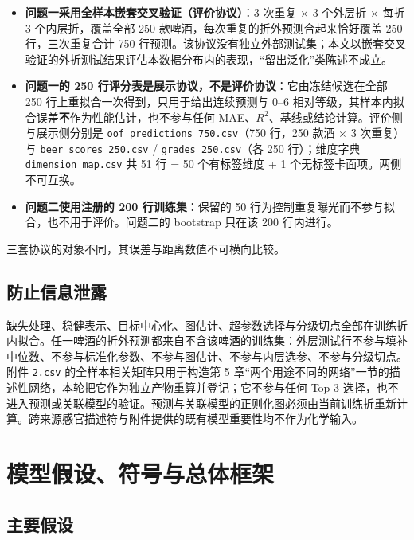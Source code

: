 \documentclass[11pt,a4paper]{article}
\providecommand{\tightlist}{%
  \setlength{\itemsep}{0pt}\setlength{\parskip}{0pt}}
\begin{document}
\begin{itemize}
\tightlist
\item
  \textbf{问题一采用全样本嵌套交叉验证（评价协议）}：3 次重复 × 3
  个外层折 × 每折 3 个内层折，覆盖全部 250
  款啤酒，每次重复的折外预测合起来恰好覆盖 250 行，三次重复合计 750
  行预测。该协议没有独立外部测试集；本文以嵌套交叉验证的外折测试结果评估本数据分布内的表现，``留出泛化''类陈述不成立。
\item
  \textbf{问题一的 250
  行评分表是展示协议，不是评价协议}：它由冻结候选在全部 250
  行上重拟合一次得到，只用于给出连续预测与 0--6
  相对等级，其样本内拟合误差\textbf{不}作为性能估计，也不参与任何
  MAE、\(R^2\)、基线或结论计算。评价侧与展示侧分别是
  \texttt{oof\_predictions\_750.csv}（750 行，250 款酒 × 3 次重复）与
  \texttt{beer\_scores\_250.csv} / \texttt{grades\_250.csv}（各 250
  行）；维度字典 \texttt{dimension\_map.csv} 共 51 行 = 50 个有标签维度
  + 1 个无标签卡面项。两侧不可互换。
\item
  \textbf{问题二使用注册的 200 行训练集}：保留的 50
  行为控制重复曝光而不参与拟合，也不用于评价。问题二的 bootstrap 只在该
  200 行内进行。
\end{itemize}

三套协议的对象不同，其误差与距离数值不可横向比较。

\subsection{防止信息泄露}\label{ux9632ux6b62ux4fe1ux606fux6cc4ux9732}

缺失处理、稳健表示、目标中心化、图估计、超参数选择与分级切点全部在训练折内拟合。任一啤酒的折外预测都来自不含该啤酒的训练集：外层测试行不参与填补中位数、不参与标准化参数、不参与图估计、不参与内层选参、不参与分级切点。附件
\texttt{2.csv} 的全样本相关矩阵只用于构造第 5
章``两个用途不同的网络''一节的描述性网络，本轮把它作为独立产物重算并登记；它不参与任何
Top-3
选择，也不进入预测或关联模型的验证。预测与关联模型的正则化图必须由当前训练折重新计算。跨来源感官描述符与附件提供的既有模型重要性均不作为化学输入。

\section{模型假设、符号与总体框架}\label{ux6a21ux578bux5047ux8bbeux7b26ux53f7ux4e0eux603bux4f53ux6846ux67b6}

\subsection{主要假设}\label{ux4e3bux8981ux5047ux8bbe}
\end{document}
